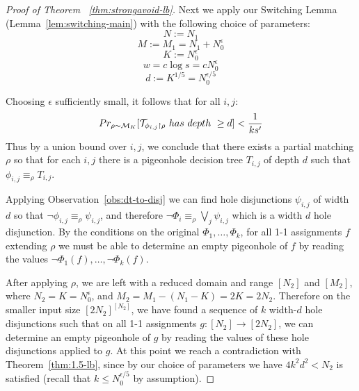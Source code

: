 \documentclass[11pt]{article}
\newcommand{\todo}[1]{\textcolor{red}{TODO: #1}}
\begin{document}
\begin{proof}[Proof of Theorem ~\ref{thm:strongavoid-lb}]
Next we apply our Switching Lemma (Lemma~\ref{lem:switching-main}) with the following choice of parameters:
$$N:= N_1$$
$$M:=M_1 = N_1 + N_0^{\epsilon}$$
$$K:=N_0^{\epsilon}$$
$$w = c \log s = c N_0^{\epsilon}$$
$$d:=K^{1/5} = N_0^{\epsilon/5} $$



Choosing $\epsilon$ sufficiently small, it follows that for all $i,j$:
$$Pr_{\rho \sim {\cal M}_K}[{\cal T}_{\phi_{i,j}\upharpoonright\rho}~ has ~depth~\geq d] < \frac{1}{ks'}$$ 
Thus by a union bound over $i,j$, we conclude that
there exists a partial matching $\rho$ 
so that for each $i,j$ there is a pigeonhole decision tree $T_{i,j}$ of depth $d$
such that $\phi_{i,j} \equiv_{\rho} T_{i,j}$.

Applying Observation~\ref{obs:dt-to-disj} we can find hole disjunctions $\psi_{i,j}$ of width $d$ so that $\lnot \phi_{i,j} \equiv_{\rho} \psi_{i,j}$, and therefore $\lnot \Phi_i \equiv_{\rho} \bigvee_j \psi_{i,j}$ which is a width $d$ hole disjunction. By the conditions on the original $\Phi_1,\ldots,\Phi_k$, for all 1-1 assignments $f$ extending $\rho$ we must be able to determine an empty pigeonhole of $f$ by reading the values $\lnot \Phi_1(f),\ldots,\lnot \Phi_k(f)$. 

After applying $\rho$, we are left with a reduced domain and range $[N_2]$ and $[M_2]$, where $N_2 = K = N_0^{\epsilon}$, and $M_2 = M_1 - (N_1 - K) = 2K = 2N_2$.
Therefore on the smaller input size $[2N_2]^{[N_2]}$, we have found a sequence of $k$ width-$d$ hole disjunctions such that on all 1-1 assignments $g: [N_2] \to [2 N_2]$, we can determine an empty pigeonhole of $g$ by reading the values of these hole disjunctions applied to $g$. At this point we reach a contradiction with Theorem~\ref{thm:1.5-lb}, since by our choice of parameters we have $4k^2d^2 < N_2$ is satisfied (recall that $k \leq N_0^{\epsilon/5}$ by assumption).%
 

\end{proof}
\end{document}
